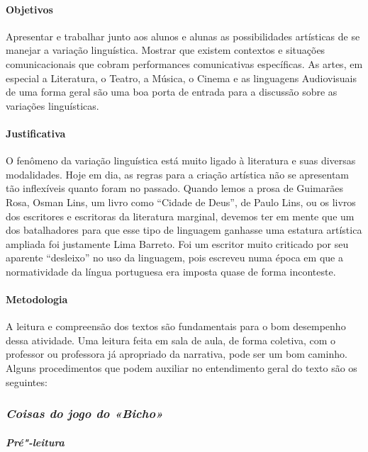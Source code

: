 \documentclass[11pt]{extarticle}
\begin{document}
\paragraph{Objetivos} Apresentar e trabalhar junto aos alunos e alunas as
possibilidades artísticas de se manejar a variação linguística. Mostrar
que existem contextos e situações comunicacionais que cobram
performances comunicativas específicas. As artes, em especial a
Literatura, o Teatro, a Música, o Cinema e as linguagens Audiovisuais de
uma forma geral são uma boa porta de entrada para a discussão sobre as
variações linguísticas.


\paragraph{Justificativa} O fenômeno da variação linguística está muito
ligado à literatura e suas diversas modalidades. Hoje em dia, as regras
para a criação artística não se apresentam tão inflexíveis quanto foram
no passado. Quando lemos a prosa de Guimarães Rosa, Osman Lins, um livro
como ``Cidade de Deus'', de Paulo Lins, ou os livros dos escritores e
escritoras da literatura marginal, devemos ter em mente que um dos
batalhadores para que esse tipo de linguagem ganhasse uma estatura
artística ampliada foi justamente Lima Barreto. Foi um escritor muito
criticado por seu aparente ``desleixo'' no uso da linguagem, pois
escreveu numa época em que a normatividade da língua portuguesa era
imposta quase de forma inconteste.

\paragraph{Metodologia} A leitura e compreensão dos textos são
fundamentais para o bom desempenho dessa atividade. Uma leitura feita em
sala de aula, de forma coletiva, com o professor ou professora já
apropriado da narrativa, pode ser um bom caminho. Alguns procedimentos
que podem auxiliar no entendimento geral do texto são os seguintes:



\subsubsection{\textit{Coisas do jogo do «Bicho»}}

\paragraph{\textit{Pré"-leitura}}
\end{document}
